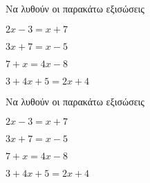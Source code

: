 Να λυθούν οι παρακάτω εξισώσεις
\begin{alist}[leftmargin=4mm]
\begin{multicols}{2}
\item $ 2x-3=x+7 $
\item $ 3x+7=x-5 $
\item $ 7+x=4x-8 $
\item $ 3+4x+5=2x+4 $
\end{multicols}
\end{alist}
Να λυθούν οι παρακάτω εξισώσεις
\begin{alist}[leftmargin=4mm]
\begin{multicols}{2}
\item $ 2x-3=x+7 $
\item $ 3x+7=x-5 $
\item $ 7+x=4x-8 $
\item $ 3+4x+5=2x+4 $
\end{multicols}
\end{alist}
